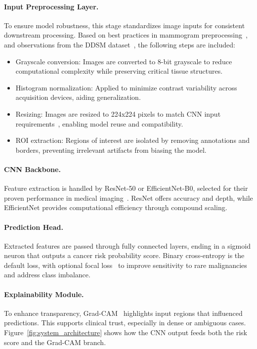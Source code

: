 \documentclass[12pt]{article}
\begin{document}
\paragraph{Input Preprocessing Layer.}

To ensure model robustness, this stage standardizes image inputs for consistent downstream processing. Based on best practices in mammogram preprocessing~\cite{7,14}, and observations from the DDSM dataset~\cite{17}, the following steps are included:

\begin{itemize}
    \item {Grayscale conversion:} Images are converted to 8-bit grayscale to reduce computational complexity while preserving critical tissue structures.
    \item {Histogram normalization:} Applied to minimize contrast variability across acquisition devices, aiding generalization.
    \item {Resizing:} Images are resized to 224x224 pixels to match CNN input requirements~\cite{1}, enabling model reuse and compatibility.
    \item {ROI extraction:} Regions of interest are isolated by removing annotations and borders, preventing irrelevant artifacts from biasing the model.
\end{itemize}
\paragraph{CNN Backbone.}
Feature extraction is handled by ResNet-50 or EfficientNet-B0, selected for their proven performance in medical imaging~\cite{1,7}. ResNet offers accuracy and depth, while EfficientNet provides computational efficiency through compound scaling.

\paragraph{Prediction Head.}
Extracted features are passed through fully connected layers, ending in a sigmoid neuron that outputs a cancer risk probability score. Binary cross-entropy is the default loss, with optional focal loss~\cite{2} to improve sensitivity to rare malignancies and address class imbalance.

\paragraph{Explainability Module.}
To enhance transparency, Grad-CAM~\cite{5} highlights input regions that influenced predictions. This supports clinical trust, especially in dense or ambiguous cases. Figure~\ref{fig:system_architecture} shows how the CNN output feeds both the risk score and the Grad-CAM branch.
\end{document}

